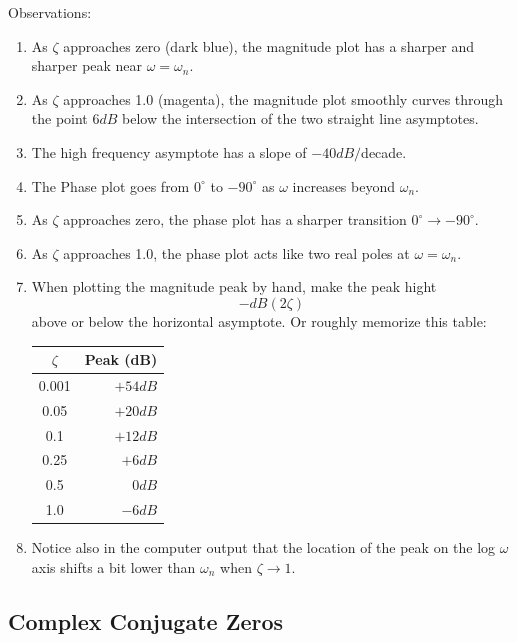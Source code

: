 \begin{ExampleCont}
Observations:

\begin{enumerate}
  \item As $\zeta$ approaches zero (dark blue), the magnitude plot has a sharper and sharper peak near $\omega=\omega_n$.
  \item As $\zeta$ approaches 1.0 (magenta), the magnitude plot smoothly curves through the point 6$dB$ below the intersection of the two straight line asymptotes.
  \item The high frequency asymptote has a slope of $-40dB/$decade.
  \item The Phase plot goes from $0^\circ$ to $-90^\circ$ as $\omega$ increases beyond $\omega_n$.

  \item As $\zeta$ approaches zero, the phase plot has a sharper transition $0^\circ \to -90^\circ$.
  \item As $\zeta$ approaches 1.0,  the phase plot acts like two real poles at $\omega = \omega_n$.
  \item When plotting the magnitude peak by hand,   make the peak hight
  \[
  -dB(2\zeta)
  \]
  above or below the horizontal asymptote.   Or roughly memorize this table:
\begin{center}
\begin{tabular}{c|r}
$\zeta$  & Peak (dB) \\\hline
0.001    &  $+54dB$ \\
0.05     &  $+20dB$ \\
0.1      &  $+12dB$  \\
0.25     &  $+6dB $  \\
0.5      &  $0dB$  \\
1.0      &  $-6dB $ \\
\end{tabular}\end{center}

  \item  Notice also in the computer output that the location  of the peak on the log $\omega$ axis
  shifts a bit lower than $\omega_n$ when $\zeta \to 1$.

\end{enumerate}

\end{ExampleCont}

\subsection{Complex Conjugate Zeros}


